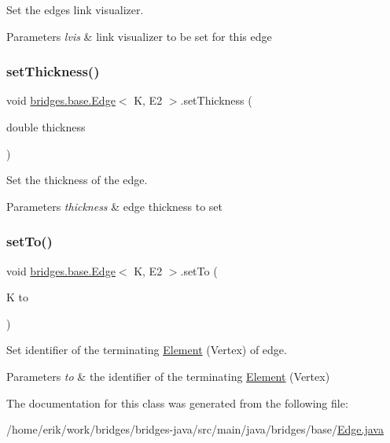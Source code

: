 Set the edge\textquotesingle{}s link visualizer. 


\begin{DoxyParams}{Parameters}
{\em lvis} & link visualizer to be set for this edge \\
\hline
\end{DoxyParams}
\mbox{\label{classbridges_1_1base_1_1_edge_ae8d87539f03f04479e5f5710ea9bf260}} 
\subsubsection{\texorpdfstring{set\+Thickness()}{setThickness()}}
{\footnotesize\ttfamily void \hyperlink{classbridges_1_1base_1_1_edge}{bridges.\+base.\+Edge}$<$ K, E2 $>$.set\+Thickness (\begin{DoxyParamCaption}\item[{double}]{thickness }\end{DoxyParamCaption})}



Set the thickness of the edge. 


\begin{DoxyParams}{Parameters}
{\em thickness} & edge thickness to set \\
\hline
\end{DoxyParams}
\mbox{\label{classbridges_1_1base_1_1_edge_a5e574139711be3f96c42da02a2702aea}} 
\subsubsection{\texorpdfstring{set\+To()}{setTo()}}
{\footnotesize\ttfamily void \hyperlink{classbridges_1_1base_1_1_edge}{bridges.\+base.\+Edge}$<$ K, E2 $>$.set\+To (\begin{DoxyParamCaption}\item[{K}]{to }\end{DoxyParamCaption})}



Set identifier of the terminating \hyperlink{classbridges_1_1base_1_1_element}{Element} (Vertex) of edge. 


\begin{DoxyParams}{Parameters}
{\em to} & the identifier of the terminating \hyperlink{classbridges_1_1base_1_1_element}{Element} (Vertex) \\
\hline
\end{DoxyParams}


The documentation for this class was generated from the following file\+:\begin{DoxyCompactItemize}
\item 
/home/erik/work/bridges/bridges-\/java/src/main/java/bridges/base/\hyperlink{_edge_8java}{Edge.\+java}\end{DoxyCompactItemize}
